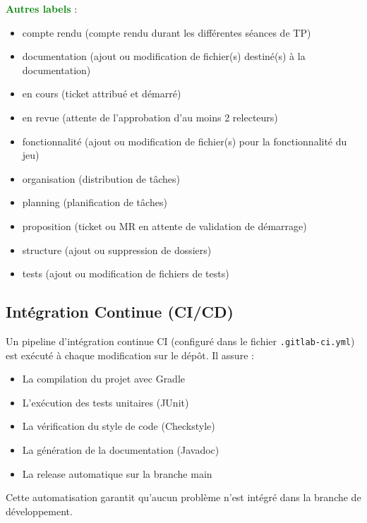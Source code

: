 \documentclass[a4paper, 12pt]{article}
\begin{document}
            \textcolor{green}{\textbf{Autres labels}} :\\
                \begin{itemize}
                    \item compte rendu (compte rendu durant les différentes séances de TP)
                    \item documentation (ajout ou modification de fichier(s) destiné(s) à la documentation)
                    \item en cours (ticket attribué et démarré)
                    \item en revue (attente de l'approbation d'au moins 2 relecteurs)
                    \item fonctionnalité (ajout ou modification de fichier(s) pour la fonctionnalité du jeu)
                    \item organisation (distribution de tâches)
                    \item planning (planification de tâches)
                    \item proposition (ticket ou MR en attente de validation de démarrage)
                    \item structure (ajout ou suppression de dossiers)
                    \item tests (ajout ou modification de fichiers de tests)
                \end{itemize}

        \subsection{Intégration Continue (CI/CD)}
            Un pipeline d'intégration continue CI (configuré dans le fichier \texttt{.gitlab-ci.yml}) est exécuté à chaque modification sur le dépôt. Il assure :
            \begin{itemize}
                \item La compilation du projet avec Gradle
                \item L'exécution des tests unitaires (JUnit)
                \item La vérification du style de code (Checkstyle)
                \item La génération de la documentation (Javadoc)
                \item La release automatique sur la branche main
            \end{itemize}
            Cette automatisation garantit qu'aucun problème n'est intégré dans la branche de développement.
            \newline
        
\end{document}
